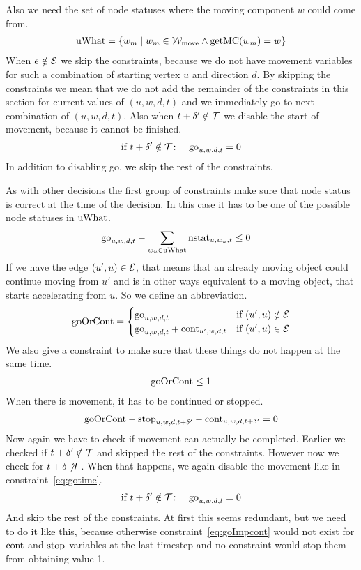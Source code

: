 Also we need the set of node statuses where the moving component $w$ could come
from.
\begin{align}
    \mathrm{uWhat} = \{w_m \mid w_m \in \mathcal{W}_\mathrm{move} \wedge \mathrm{getMC}(w_m) = w\}
\end{align}
When $e \notin \mathcal{E}$ we skip the constraints, because we do not have movement
variables for such a combination of starting vertex $u$ and direction $d$. By
skipping the constraints we mean that we do not add the remainder of the
constraints in this section for current values of $(u,w,d,t)$ and we
immediately go to next combination of $(u,w,d,t)$. Also when $t+\delta' \notin \mathcal{T}$
we disable the start of movement, because it cannot be finished.
\begin{align}
    \label{eq:gotime}
    &\text{if}\ t+\delta' \notin \mathcal{T} \colon &\mathrm{go}_{u,w,d,t} = 0
\end{align}
In addition to disabling go, we skip the rest of the constraints.

As with other decisions the first group of constraints make sure that node
status is correct at the time of the decision. In this case it has to be one of
the possible node statuses in $\mathrm{uWhat}$.
\begin{align}
    & \mathrm{go}_{u,w,d,t} - \sum_{w_u \in \mathrm{uWhat}} \mathrm{nstat}_{u,w_u,t} \leq 0
\end{align}
If we have the edge $(u',u) \in \mathcal{E}$, that means that an already moving object
could continue moving from $u'$ and is in other ways equivalent to a moving
object, that starts accelerating from $u$. So we define an abbreviation.
\begin{align*}
    \mathrm{goOrCont} = \begin{cases}
        \mathrm{go}_{u,w,d,t} &\text{if}\  (u',u) \notin \mathcal{E}\\
        \mathrm{go}_{u,w,d,t} + \mathrm{cont}_{u',w,d,t} &\text{if}\  (u',u) \in \mathcal{E}
    \end{cases}
\end{align*}
We also give a constraint to make sure that these things do not happen at the
same time.
\begin{align}
    \mathrm{goOrCont} \leq 1
\end{align}
When there is movement, it has to be continued or stopped.
\begin{align}
    \label{eq:goImpcont}
    \mathrm{goOrCont} - \mathrm{stop}_{u,w,d,t+\delta'} - \mathrm{cont}_{u,w,d,t+\delta'} = 0
\end{align}
Now again we have to check if movement can actually be completed. Earlier we
checked if $t+\delta' \notin \mathcal{T}$ and skipped the rest of the constraints. However
now we check for $t+\delta \not \mathcal{T}$. When that happens, we again disable the
movement like in constraint~\eqref{eq:gotime}.
\begin{align}
    &\text{if}\ t+\delta' \notin \mathcal{T} \colon &\mathrm{go}_{u,w,d,t} = 0
\end{align}
And skip the rest of the constraints. At first this seems redundant, but we
need to do it like this, because otherwise constraint~\eqref{eq:goImpcont} would
not exist for $\mathrm{cont}$ and $\mathrm{stop}$ variables at the last timestep and no
constraint would stop them from obtaining value 1.

